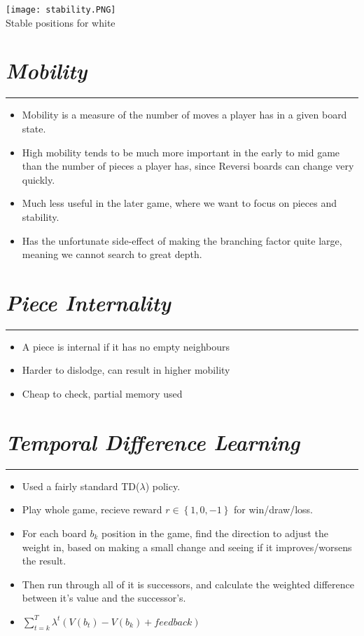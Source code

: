 \documentclass[10pt]{report}
\begin{document}
\begin{center}
\texttt{[image: stability.PNG]}\\
Stable positions for white
\end{center}

\section*{\emph{\textmd{Mobility}}}
\hrule
    \begin{itemize}
  \item
	Mobility is a measure of the number of moves a player has in a given board state.
  \item
	High mobility tends to be much more important in the early to mid game than the number of pieces a player has, since Reversi boards can change very quickly.
  \item
	Much less useful in the later game, where we want to focus on pieces and stability.
  \item
	Has the unfortunate side-effect of making the branching factor quite large, meaning we cannot search to great depth.
  \end{itemize}

\section*{\emph{\textmd{Piece Internality}}}
\hrule
    \begin{itemize}
  \item
  A piece is internal if it has no empty neighbours
  \item
   Harder to dislodge, can result in higher mobility
  \item
   Cheap to check, partial memory used
  \end{itemize}

\section*{\emph{Temporal Difference Learning}}
\hrule
   \begin{itemize}
  \item
  	Used a fairly standard TD($\lambda$) policy.
  \item
	Play whole game, recieve reward $r\in \left\{1,0,-1 \right\}$ for win/draw/loss.
  \item
	For each board $b_k$ position in the game, find the direction to adjust the weight in, based on making a small change and seeing if it improves/worsens the result.
 \item
	Then run through all of it is successors, and calculate the weighted difference between it's value and the successor's.
  \item
	$\sum_{t=k}^T \lambda^t \left ( V(b_t) - V(b_k) + feedback \right)$
  \end{itemize}
\end{document}
